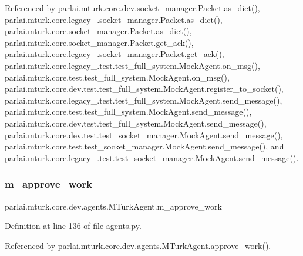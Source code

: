 Referenced by parlai.\+mturk.\+core.\+dev.\+socket\+\_\+manager.\+Packet.\+as\+\_\+dict(), parlai.\+mturk.\+core.\+legacy\+\_.\+socket\+\_\+manager.\+Packet.\+as\+\_\+dict(), parlai.\+mturk.\+core.\+socket\+\_\+manager.\+Packet.\+as\+\_\+dict(), parlai.\+mturk.\+core.\+socket\+\_\+manager.\+Packet.\+get\+\_\+ack(), parlai.\+mturk.\+core.\+legacy\+\_.\+socket\+\_\+manager.\+Packet.\+get\+\_\+ack(), parlai.\+mturk.\+core.\+legacy\+\_.\+test.\+test\+\_\+full\+\_\+system.\+Mock\+Agent.\+on\+\_\+msg(), parlai.\+mturk.\+core.\+test.\+test\+\_\+full\+\_\+system.\+Mock\+Agent.\+on\+\_\+msg(), parlai.\+mturk.\+core.\+dev.\+test.\+test\+\_\+full\+\_\+system.\+Mock\+Agent.\+register\+\_\+to\+\_\+socket(), parlai.\+mturk.\+core.\+legacy\+\_.\+test.\+test\+\_\+full\+\_\+system.\+Mock\+Agent.\+send\+\_\+message(), parlai.\+mturk.\+core.\+test.\+test\+\_\+full\+\_\+system.\+Mock\+Agent.\+send\+\_\+message(), parlai.\+mturk.\+core.\+dev.\+test.\+test\+\_\+full\+\_\+system.\+Mock\+Agent.\+send\+\_\+message(), parlai.\+mturk.\+core.\+dev.\+test.\+test\+\_\+socket\+\_\+manager.\+Mock\+Agent.\+send\+\_\+message(), parlai.\+mturk.\+core.\+test.\+test\+\_\+socket\+\_\+manager.\+Mock\+Agent.\+send\+\_\+message(), and parlai.\+mturk.\+core.\+legacy\+\_.\+test.\+test\+\_\+socket\+\_\+manager.\+Mock\+Agent.\+send\+\_\+message().

\mbox{\label{classparlai_1_1mturk_1_1core_1_1dev_1_1agents_1_1MTurkAgent_a920dcb532365407c95f30d8ac6918da6}} 
\subsubsection{\texorpdfstring{m\+\_\+approve\+\_\+work}{m\_approve\_work}}
{\footnotesize\ttfamily parlai.\+mturk.\+core.\+dev.\+agents.\+M\+Turk\+Agent.\+m\+\_\+approve\+\_\+work}



Definition at line 136 of file agents.\+py.



Referenced by parlai.\+mturk.\+core.\+dev.\+agents.\+M\+Turk\+Agent.\+approve\+\_\+work().

